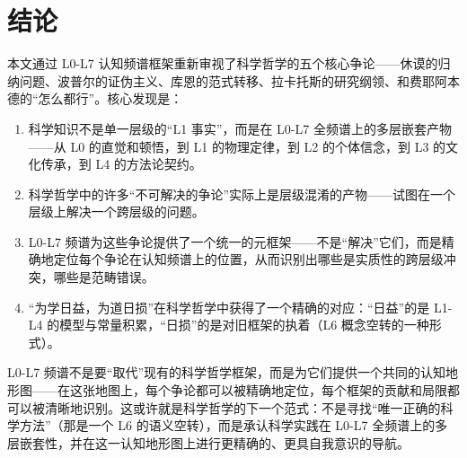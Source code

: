 \documentclass[UTF8,12pt,a4paper]{ctexart}
\begin{document}
\section{结论}

本文通过 L0-L7 认知频谱框架重新审视了科学哲学的五个核心争论——休谟的归纳问题、波普尔的证伪主义、库恩的范式转移、拉卡托斯的研究纲领、和费耶阿本德的``怎么都行''。核心发现是：

\begin{enumerate}[nosep]
    \item 科学知识不是单一层级的``L1 事实''，而是在 L0-L7 全频谱上的多层嵌套产物——从 L0 的直觉和顿悟，到 L1 的物理定律，到 L2 的个体信念，到 L3 的文化传承，到 L4 的方法论契约。
    \item 科学哲学中的许多``不可解决的争论''实际上是层级混淆的产物——试图在一个层级上解决一个跨层级的问题。
    \item L0-L7 频谱为这些争论提供了一个统一的元框架——不是``解决''它们，而是精确地定位每个争论在认知频谱上的位置，从而识别出哪些是实质性的跨层级冲突，哪些是范畴错误。
    \item ``为学日益，为道日损''在科学哲学中获得了一个精确的对应：``日益''的是 L1-L4 的模型与常量积累，``日损''的是对旧框架的执着（L6 概念空转的一种形式）。
\end{enumerate}

L0-L7 频谱不是要``取代''现有的科学哲学框架，而是为它们提供一个共同的认知地形图——在这张地图上，每个争论都可以被精确地定位，每个框架的贡献和局限都可以被清晰地识别。这或许就是科学哲学的下一个范式：不是寻找``唯一正确的科学方法''（那是一个 L6 的语义空转），而是承认科学实践在 L0-L7 全频谱上的多层嵌套性，并在这一认知地形图上进行更精确的、更具自我意识的导航。
\end{document}
